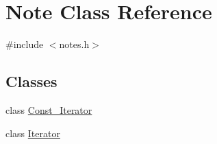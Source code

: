 \hypertarget{classNote}{}\section{Note Class Reference}
\label{classNote}


{\ttfamily \#include $<$notes.\+h$>$}

\subsection*{Classes}
\begin{DoxyCompactItemize}
\item 
class \hyperlink{classNote_1_1Const__Iterator}{Const\+\_\+\+Iterator}
\item 
class \hyperlink{classNote_1_1Iterator}{Iterator}
\end{DoxyCompactItemize}
